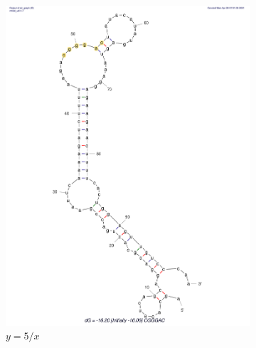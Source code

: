 \begin{figure}
\begin{subfigure}[b]{0.49\textwidth}
         \includegraphics[scale=0.25]{plots/Supplementary/Structure_CGGGAC.pdf}
         \caption{$y=5/x$}
         \label{fig:CGGGAC}
     \end{subfigure}
     \hfill
     \begin{subfigure}[b]{0.49\textwidth}
         \centering

\end{subfigure}
\end{figure}
